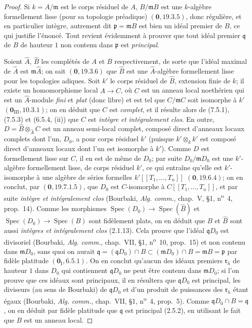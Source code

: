 \begin{proof}
Si $k=A/\mathfrak m$ est le corps résiduel de $A$, $B/\mathfrak mB$ est une
$k$-algèbre formellement lisse (pour
sa topologie préadique) $(\mathbf 0, 19.3.5)$,
donc régulière, et en particulier intègre, autrement dit
$\mathfrak p=\mathfrak mB$ est bien un idéal premier de $B$, ce qui justifie
l'énoncé. Tout revient évidemment à prouver que tout idéal premier $\mathfrak q$ de
$B$ de hauteur $1$ non contenu dans $\mathfrak p$ est \emph{principal}.

Soient $\widehat A$, $\widehat B$ les complétés de $A$ et $B$ respectivement, de
sorte que l'idéal maximal de $\widehat A$ est $\mathfrak m\widehat A$; on sait
$(\mathbf 0, 19.3.6)$ que $\widehat B$ est une $\widehat A$-algèbre formellement
lisse pour les topologies adiques. Soit $k'$ le corps résiduel de $\widehat B$,
extension finie de $k$; il existe un homomorphisme local $\widehat A\to C$, où $C$
est un anneau local noethérien qui est un $\widehat A$-module \emph{fini} et
\emph{plat} (donc libre) et est tel que $C/\mathfrak mC$ soit isomorphe à $k'$
$(\mathbf 0_{\mathrm{III}}, 10.3.1)$; on en déduit que $C$ est \emph{complet}, et il
résulte alors de (7.5.1), (7.5.3) et (6.5.4, (ii)) que $C$ est \emph{intègre et
intégralement clos}. En outre, $D=\widehat B\otimes_{\widehat A}C$
est un anneau semi-local complet, composé direct d'anneaux locaux complets dont l'un,
$D_0$, a pour corps résiduel $k'$ (puisque $k'\otimes_k k'$ est composé direct
d'anneaux locaux dont l'un est isomorphe à $k'$). Comme $D$ est formellement lisse
sur $C$, il en est de même de $D_0$; par suite $D_0/\mathfrak mD_0$ est une
$k'$-algèbre formellement lisse, de corps résiduel $k'$, ce qui entraîne qu'elle est
$k'$-isomorphe à une algèbre de séries formelles
$k'[[T_1,\ldots,T_n]]$ $(\mathbf 0, 19.6.4)$; on en conclut, par
$(\mathbf 0, 19.7.1.5)$, que $D_0$ est $C$-isomorphe à
$C[[T_1,\ldots,T_n]]$, et par suite \emph{intègre et intégralement clos} (Bourbaki,
\emph{Alg. comm.}, chap.~V, \S1, n\textsuperscript{o}~4, prop.~14). Comme les
morphismes $\operatorname{Spec}(D_0)\to\operatorname{Spec}(\widehat B)$ et
$\operatorname{Spec}(D_0)\to\operatorname{Spec}(B)$ sont fidèlement plats, on en
déduit que $B$ et $\widehat B$ sont aussi \emph{intègres et intégralement clos}
(2.1.13). Cela prouve que l'idéal $\mathfrak qD_0$ est divisoriel (Bourbaki,
\emph{Alg. comm.}, chap.~VII, \S1, n\textsuperscript{o}~10, prop.~15) et non contenu
dans $\mathfrak mD_0$, sans quoi on aurait
$\mathfrak q=(\mathfrak qD_0)\cap B\subset(\mathfrak mD_0)\cap B=\mathfrak mB=\mathfrak p$
par fidèle platitude $(\mathbf 0_{\mathrm I}, 6.5.1)$. On en conclut qu'aucun des
idéaux premiers $\mathfrak r_h$ de hauteur $1$ dans $D_0$ qui contiennent
$\mathfrak qD_0$ ne peut être contenu dans $\mathfrak mD_0$; si l'on prouve que ces
idéaux sont principaux, il en résultera que $\mathfrak qD_0$ est principal, les
diviseurs (au sens de Bourbaki) de $\mathfrak qD_0$ et d'un produit de puissances des
$\mathfrak r_h$ étant égaux (Bourbaki, \emph{Alg. comm.}, chap.~VII, \S1,
n\textsuperscript{o}~4, prop.~5). Comme $\mathfrak qD_0\cap B=\mathfrak q$, on en
déduit par fidèle platitude que $\mathfrak q$ est principal (2.5.2), en utilisant le
fait que $B$ est un anneau local.


\end{proof}
